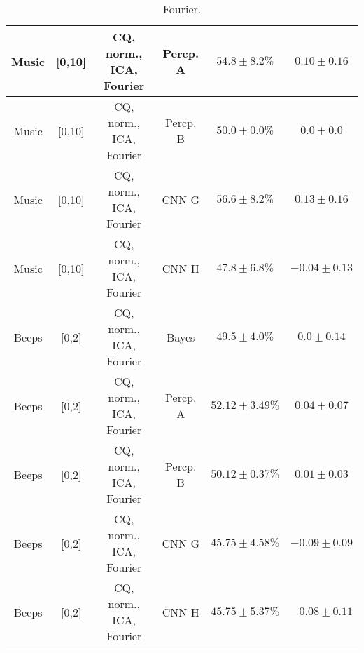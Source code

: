 \begin{table}[!htb]
{\begin{tabular}{c|c|c|c|c|c}
    \hline
    Music               & [0,10]                                        & CQ, norm., ICA, Fourier    & Percp. A              &  $54.8 \pm 8.2\%$     & $0.10 \pm 0.16$\\
    \hline
    Music               & [0,10]                                        & CQ, norm., ICA, Fourier    & Percp. B              &  $50.0 \pm 0.0\%$     & $0.0 \pm 0.0$\\
    \hline
    Music               & [0,10]                                        & CQ, norm., ICA, Fourier    & CNN G                 &  $56.6 \pm 8.2\%$     & $0.13 \pm 0.16$\\
    \hline
    Music               & [0,10]                                        & CQ, norm., ICA, Fourier    & CNN H                 &  $47.8 \pm 6.8\%$     & $-0.04 \pm 0.13$\\
    \hline \hline
    Beeps               & [0,2]                                         & CQ, norm., ICA, Fourier    & Bayes                 &  $49.5 \pm 4.0\%$     & $0.0 \pm 0.14$\\
    \hline
    Beeps               & [0,2]                                         & CQ, norm., ICA, Fourier    & Percp. A              &  $52.12 \pm 3.49\%$     & $0.04 \pm 0.07$\\
    \hline
    Beeps               & [0,2]                                         & CQ, norm., ICA, Fourier    & Percp. B              &  $50.12 \pm 0.37\%$     & $0.01 \pm 0.03$\\
    \hline
    Beeps               & [0,2]                                         & CQ, norm., ICA, Fourier    & CNN G                 &  $45.75 \pm 4.58\%$     & $-0.09 \pm 0.09$\\
    \hline
    Beeps               & [0,2]                                         & CQ, norm., ICA, Fourier    & CNN H                 &  $45.75 \pm 5.37\%$     & $-0.08 \pm 0.11$\\
    \hline
\end{tabular}
}
\caption{Fourier.}
\label{tab:sound-fourier-app}
\end{table}